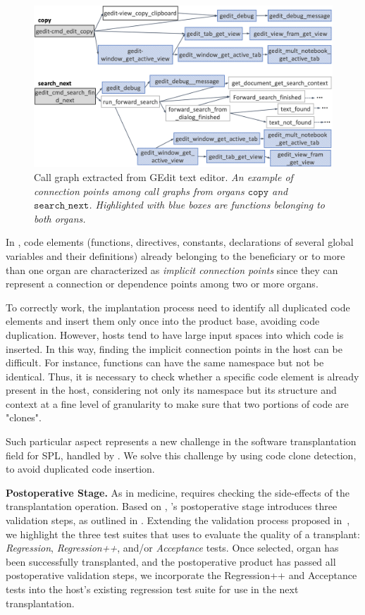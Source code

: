 \begin{figure}[t]
	\centering \includegraphics[width=\linewidth]{images/organs_dependency3.png}	\caption{Call graph extracted from GEdit text editor. \textit{An example of connection points among call graphs from organs $\texttt{copy}$ and $\texttt{search\_next}$. Highlighted with blue boxes are functions belonging to both organs.}}
	\label{fig:organs_connection_point}
\end{figure} 

In \FOUNDRY, code elements (functions, directives, constants, declarations of several global variables and their definitions) already belonging to the beneficiary or to more than one organ are characterized as \emph{implicit connection points} since they can represent a connection or dependence points among two or more organs. 

To correctly work, the implantation process need to identify all duplicated code elements and insert them only once into the product base, avoiding code duplication. However, hosts tend to have large input spaces into which code is inserted. In this way, finding the implicit connection points in the host can be difficult. For instance, functions can have the same namespace but not be identical. Thus, it is necessary to check whether a specific code element is already present in the host, considering not only its namespace but its structure and context at a fine level of granularity to make sure that two portions of code are "clones".

Such particular aspect represents a new challenge in the software transplantation field for SPL, handled by \FOUNDRY. 
We solve this challenge by using code clone detection, to avoid duplicated code insertion.

\textbf{Postoperative Stage.} As in medicine, \FOUNDRY requires checking the side-effects of the transplantation operation. Based on \cite{Barr2015}, \FOUNDRY's postoperative stage introduces three validation steps, as outlined in . Extending the validation process proposed in~\cite{Harman2013, Barr2015}, we highlight the three test suites that \FOUNDRY uses to evaluate the quality of a transplant: \emph{Regression}, \emph{Regression++}, and/or \emph{Acceptance} tests.
Once selected, organ has been successfully transplanted, and the postoperative product has passed all postoperative validation steps, we incorporate the Regression++ and Acceptance tests into the host's existing regression test suite for use in the next transplantation.

